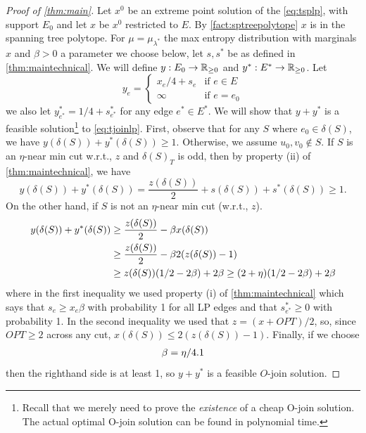 \begin{proof}[Proof of \cref{thm:main}]
Let $x^0$ be an extreme point solution of the \ref{eq:tsplp}, with support $E_0$ and let $x$ be $x^0$ restricted to $E$. By \cref{fact:sptreepolytope} $x$ is in the spanning tree polytope. 
For $\mu=\mu_{\lambda^*}$ the max entropy distribution with marginals $x$ and $\beta > 0$ a parameter we choose below, let $s,s^*$ be as defined in \cref{thm:maintechnical}.
We will define $y:E_0\to\mathbb{R}_{\geq 0}$ and $y^*:E^*\to\mathbb{R}_{\geq 0}$. %
Let  
$$y_e=\begin{cases}
x_e/4+s_e & \text{if } e\in E\\
\infty & \text{if } e=e_0
\end{cases}
$$	
we also let $y^*_{e^*}=1/4+s^*_{e^*}$ for any edge $e^*\in E^*$.
We will show that $y + y^*$ is a feasible solution\footnote{Recall that we merely need to prove the {\em existence} of  a cheap O-join solution. The actual optimal O-join solution can be found in polynomial time.}
to \eqref{eq:tjoinlp}.
First, observe that for any $S$ where $e_0\in\delta(S)$, we have $y(\delta(S))+y^*(\delta(S))\geq 1$. Otherwise, we assume $u_0,v_0\notin S$.
If $S$ is an $\eta$-near min cut  w.r.t., $z$ and $\delta(S)_T$ is odd, then by property (ii) of \cref{thm:maintechnical}, we have
$$ y(\delta(S))+y^*(\delta(S)) = \frac{z(\delta(S))}{2}+ s(\delta(S))+s^*(\delta(S))\geq 1.$$
On the other hand, if $S$  is not an $\eta$-near min cut (w.r.t., $z$). 
\begin{align*} y(\delta(S)) + y^*(\delta(S)) &\geq  \frac{z(\delta(S))}{2} - \beta x(\delta(S))\\
&\geq \frac{z(\delta(S))}{2} - \beta 2(z(\delta(S))-1)	\\
&\geq z(\delta(S)) (1/2-2\beta)+ 2\beta\geq (2+\eta) (1/2-2\beta)+2\beta
\end{align*}
where in the first inequality we used property (i) of \cref{thm:maintechnical} which says that $s_e\geq x_e \beta$ with probability 1 for all LP edges and that $s^*_{e^*}\geq 0$ with probability 1.
In the second inequality we used that $z=(x+OPT)/2$, so, since $OPT\geq 2$ across any cut, $x(\delta(S))\leq 2(z(\delta(S))-1)$. Finally, if we choose \begin{align}\label{def:decrease-param}\beta = \eta/4.1\end{align} then the righthand side is at least 1, so $y+y^*$ is a feasible $O$-join solution.


\end{proof}
